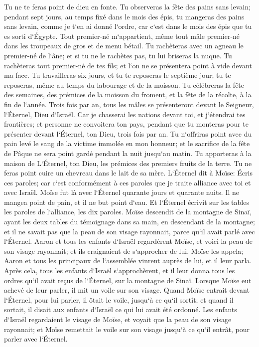 \verse Tu ne te feras point de dieu en fonte. 
\verse Tu observeras la fête des pains sans levain; pendant sept jours, au temps fixé dans le mois des épis, tu mangeras des pains sans levain, comme je t`en ai donné l`ordre, car c`est dans le mois des épis que tu es sorti d`Égypte. 
\verse Tout premier-né m`appartient, même tout mâle premier-né dans les troupeaux de gros et de menu bétail. 
\verse Tu rachèteras avec un agneau le premier-né de l`âne; et si tu ne le rachètes pas, tu lui briseras la nuque. Tu rachèteras tout premier-né de tes fils; et l`on ne se présentera point à vide devant ma face. 
\verse Tu travailleras six jours, et tu te reposeras le septième jour; tu te reposeras, même au temps du labourage et de la moisson. 
\verse Tu célébreras la fête des semaines, des prémices de la moisson du froment, et la fête de la récolte, à la fin de l`année. 
\verse Trois fois par an, tous les mâles se présenteront devant le Seigneur, l`Éternel, Dieu d`Israël. 
\verse Car je chasserai les nations devant toi, et j`étendrai tes frontières; et personne ne convoitera ton pays, pendant que tu monteras pour te présenter devant l`Éternel, ton Dieu, trois fois par an. 
\verse Tu n`offriras point avec du pain levé le sang de la victime immolée en mon honneur; et le sacrifice de la fête de Pâque ne sera point gardé pendant la nuit jusqu`au matin. 
\verse Tu apporteras à la maison de L`Éternel, ton Dieu, les prémices des premiers fruits de la terre. Tu ne feras point cuire un chevreau dans le lait de sa mère. 
\verse L`Éternel dit à Moïse: Écris ces paroles; car c`est conformément à ces paroles que je traite alliance avec toi et avec Israël. 
\verse Moïse fut là avec l`Éternel quarante jours et quarante nuits. Il ne mangea point de pain, et il ne but point d`eau. Et l`Éternel écrivit sur les tables les paroles de l`alliance, les dix paroles. 
\verse Moïse descendit de la montagne de Sinaï, ayant les deux tables du témoignage dans sa main, en descendant de la montagne; et il ne savait pas que la peau de son visage rayonnait, parce qu`il avait parlé avec l`Éternel. 
\verse Aaron et tous les enfants d`Israël regardèrent Moïse, et voici la peau de son visage rayonnait; et ils craignaient de s`approcher de lui. 
\verse Moïse les appela; Aaron et tous les principaux de l`assemblée vinrent auprès de lui, et il leur parla. 
\verse Après cela, tous les enfants d`Israël s`approchèrent, et il leur donna tous les ordres qu`il avait reçus de l`Éternel, sur la montagne de Sinaï. 
\verse Lorsque Moïse eut achevé de leur parler, il mit un voile sur son visage. 
\verse Quand Moïse entrait devant l`Éternel, pour lui parler, il ôtait le voile, jusqu`à ce qu`il sortît; et quand il sortait, il disait aux enfants d`Israël ce qui lui avait été ordonné. 
\verse Les enfants d`Israël regardaient le visage de Moïse, et voyait que la peau de son visage rayonnait; et Moïse remettait le voile sur son visage jusqu`à ce qu`il entrât, pour parler avec l`Éternel. 

